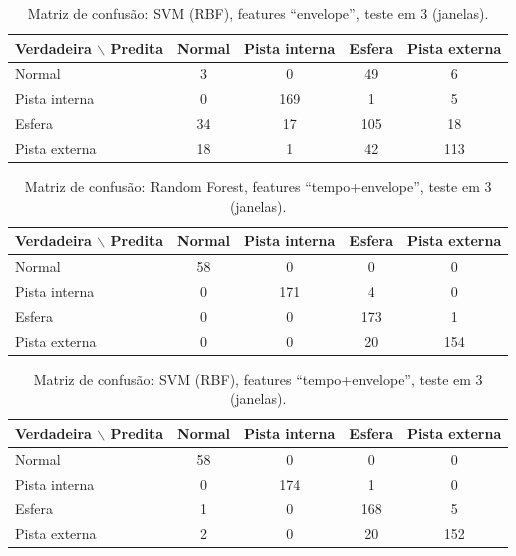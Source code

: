 \begin{table}[htb]
  \centering
  \caption{Matriz de confusão: SVM (RBF), features ``envelope'', teste em \SI{3}{\hp} (janelas).}
  \label{tab:confusao-svm-envelope}
  \begin{tabular}{lcccc}
    \toprule
    \textbf{Verdadeira $\backslash$ Predita} & \textbf{Normal} & \textbf{Pista interna} & \textbf{Esfera} & \textbf{Pista externa} \\
    \midrule
    Normal & 3 & 0 & 49 & 6 \\
    Pista interna & 0 & 169 & 1 & 5 \\
    Esfera & 34 & 17 & 105 & 18 \\
    Pista externa & 18 & 1 & 42 & 113 \\
    \bottomrule
  \end{tabular}
\end{table}

\begin{table}[htb]
  \centering
  \caption{Matriz de confusão: Random Forest, features ``tempo+envelope'', teste em \SI{3}{\hp} (janelas).}
  \label{tab:confusao-random-forest-tempo-envelope}
  \begin{tabular}{lcccc}
    \toprule
    \textbf{Verdadeira $\backslash$ Predita} & \textbf{Normal} & \textbf{Pista interna} & \textbf{Esfera} & \textbf{Pista externa} \\
    \midrule
    Normal & 58 & 0 & 0 & 0 \\
    Pista interna & 0 & 171 & 4 & 0 \\
    Esfera & 0 & 0 & 173 & 1 \\
    Pista externa & 0 & 0 & 20 & 154 \\
    \bottomrule
  \end{tabular}
\end{table}

\begin{table}[htb]
  \centering
  \caption{Matriz de confusão: SVM (RBF), features ``tempo+envelope'', teste em \SI{3}{\hp} (janelas).}
  \label{tab:confusao-svm-tempo-envelope}
  \begin{tabular}{lcccc}
    \toprule
    \textbf{Verdadeira $\backslash$ Predita} & \textbf{Normal} & \textbf{Pista interna} & \textbf{Esfera} & \textbf{Pista externa} \\
    \midrule
    Normal & 58 & 0 & 0 & 0 \\
    Pista interna & 0 & 174 & 1 & 0 \\
    Esfera & 1 & 0 & 168 & 5 \\
    Pista externa & 2 & 0 & 20 & 152 \\
    \bottomrule
  \end{tabular}
\end{table}

